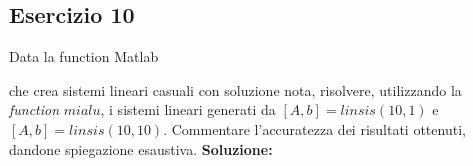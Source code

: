 \subsection{Esercizio 10}
Data la function Matlab

che crea sistemi lineari casuali con soluzione nota, risolvere, utilizzando la \textit{function} $mialu$, i sistemi
lineari generati da $[A,b]=linsis(10,1)$ e $[A,b]=linsis(10,10)$. Commentare l'accuratezza dei
risultati ottenuti, dandone spiegazione esaustiva.
\newline \textbf{Soluzione:}
